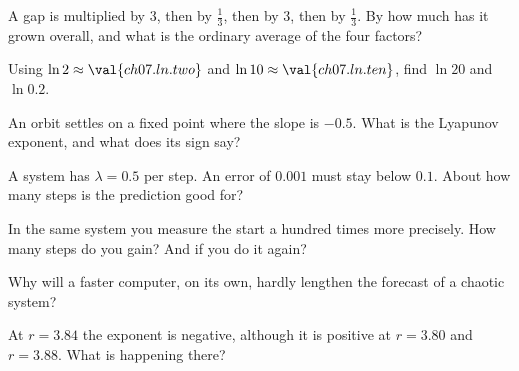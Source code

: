 \begin{checkpoint}
\item A gap is multiplied by $3$, then by $\tfrac13$, then by $3$, then by
  $\tfrac13$. By how much has it grown overall, and what is the ordinary
  average of the four factors?
\item Using $\ln 2 \approx \val{ch07.ln.two}$ and $\ln 10 \approx \val{ch07.ln.ten}$, find
  $\ln 20$ and $\ln\num{0.2}$.
\item An orbit settles on a fixed point where the slope is $-\num{0.5}$. What
  is the Lyapunov exponent, and what does its sign say?
\item A system has $\lambda = \num{0.5}$ per step. An error of $\num{0.001}$
  must stay below $\num{0.1}$. About how many steps is the prediction good
  for?
\item In the same system you measure the start a hundred times more
  precisely. How many steps do you gain? And if you do it again?
\item Why will a faster computer, on its own, hardly lengthen the forecast of
  a chaotic system?
\item At $r = \num{3.84}$ the exponent is negative, although it is positive at
  $r = \num{3.80}$ and $r = \num{3.88}$. What is happening there?
\end{checkpoint}
